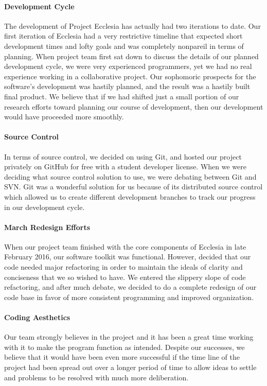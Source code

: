 \documentclass[letterpaper, 10pt]{article}
\begin{document}
	\paragraph{Development Cycle}
	The development of Project Ecclesia has actually had two iterations to date. Our first iteration of Ecclesia had a very restrictive timeline that expected short development times and lofty goals and was completely nonpareil in terms of planning. When project team first sat down to discuss the details of our planned development cycle, we were very experienced programmers, yet we had no real experience working in a collaborative project. Our sophomoric prospects for the software's development was hastily planned, and the result was a hastily built final product. We believe that if we had shifted just a small portion of our research efforts toward planning our course of development, then our development would have proceeded more smoothly.
	
	\paragraph{Source Control}
	In terms of source control, we decided on using Git, and hosted our project privately on GitHub for free with a student developer license. When we were deciding what source control solution to use, we were debating between Git and SVN. Git was a wonderful solution for us because of its distributed source control which allowed us to create different development branches to track our progress in our development cycle.
	
	\paragraph{March Redesign Efforts}
	When our project team finished with the core components of Ecclesia in late February 2016, our software toolkit was functional. However, decided that our code needed major refactoring in order to maintain the ideals of clarity and conciseness that we so wished to have. We entered the slippery slope of code refactoring, and after much debate, we decided to do a complete redesign of our code base in favor of more consistent programming and improved organization.
	
	\paragraph{Coding Aesthetics}
	Our team strongly believes in the project and it has been a great time working with it to make the program function as intended. Despite our successes, we believe that it would have been even more successful if the time line of the project had been spread out over a longer period of time to allow ideas to settle and problems to be resolved with much more deliberation.
	
\end{document}

